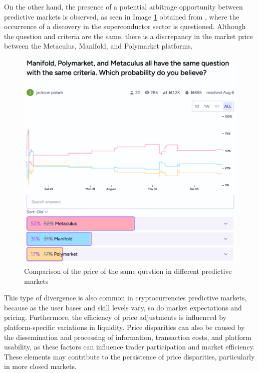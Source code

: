 On the other hand, the presence of a potential arbitrage opportunity between predictive markets is observed, as seen in Image \ref{fig:market_comparison} obtained from \cite{Polack}, where the occurrence of a discovery in the superconductor sector is questioned. Although the question and criteria are the same, there is a discrepancy in the market price between the Metaculus, Manifold, and Polymarket platforms.

\begin{figure}[H]
    \centering
    \includegraphics[scale=0.6]{img/MarketComparison.png}
    \caption{Comparison of the price of the same question in different predictive markets}
    \label{fig:market_comparison}
\end{figure}

This type of divergence is also common in cryptocurrencies predictive markets, because as the user bases and skill levels vary, so do market expectations and pricing. Furthermore, the efficiency of price adjustments is influenced by platform-specific variations in liquidity. Price disparities can also be caused by the dissemination and processing of information, transaction costs, and platform usability, as these factors can influence trader participation and market efficiency. These elements may contribute to the persistence of price disparities, particularly in more closed markets.

